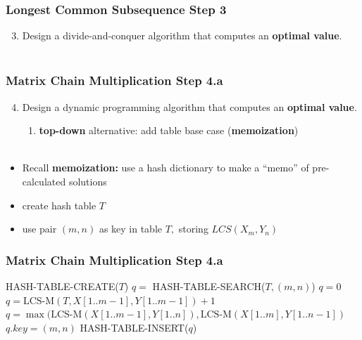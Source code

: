 \documentclass{beamer}
\newcommand{\stanza}{ \\~\ }
\begin{document}
\begin{frame} \frametitle{Longest Common Subsequence Step 3}
  \begin{enumerate}
    \setcounter{enumi}{2}
    \item Design a divide-and-conquer algorithm that computes an \textbf{optimal value}.
    \stanza
  \end{enumerate}

  {\scriptsize
  \begin{algorithmic}[1]
      \State {}
      \State {}
    \Else
      \State {}
    \EndIf
    \EndFunction
  \end{algorithmic}
  }
\end{frame}
    
  \begin{frame} \frametitle{Matrix Chain Multiplication Step 4.a}
    \begin{enumerate}
      \setcounter{enumi}{3}
      \item Design a dynamic programming algorithm that computes an \textbf{optimal value}.
      \begin{enumerate}
        \item \textbf{top-down} alternative: add table base case (\textbf{memoization})
        \stanza
      \end{enumerate}
  \end{enumerate}

  \begin{itemize}
    \item Recall \textbf{memoization:} use a hash dictionary to make a ``memo'' of pre-calculated solutions
    \item create hash table $T$
    \item use pair $(m, n)$ as key in table $T,$ storing $LCS(X_m, Y_n)$
  \end{itemize}
  
\end{frame}  

\begin{frame} \frametitle{Matrix Chain Multiplication Step 4.a}
  {\scriptsize
  \begin{algorithmic}[1]
    \State HASH-TABLE-CREATE($T$)
    \State {}
    \EndFunction
    \State $q = $ HASH-TABLE-SEARCH($T, (m, n)$)
      \State {}
    \EndIf
      \State $q=0$
      \State $q = \text{LCS-M}(T, X[1..m-1], Y[1..m-1]) + 1$
    \Else
      \State $q = \max(\text{LCS-M}(X[1..m-1], Y[1..n]), \text{LCS-M}(X[1..m], Y[1..n-1])$
    \EndIf
    \State $q.key = (m, n)$
    \State HASH-TABLE-INSERT($q$)
    \State {}
    \EndFunction
  \end{algorithmic}
  }
\end{frame}
\end{document}
